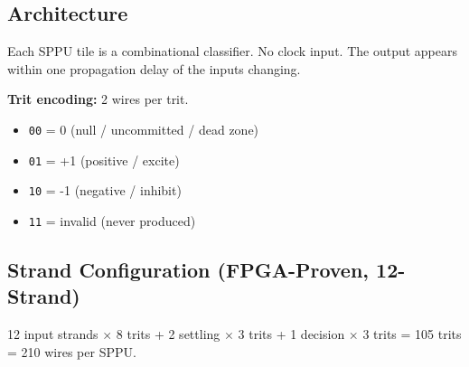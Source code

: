 \documentclass[11pt, a4paper]{article}
\begin{document}
\subsection{Architecture}

Each SPPU tile is a combinational classifier. No clock input.
The output appears within one propagation delay of the inputs
changing.

\textbf{Trit encoding:} 2 wires per trit.
\begin{itemize}[nosep]
  \item \texttt{00} = 0 (null / uncommitted / dead zone)
  \item \texttt{01} = +1 (positive / excite)
  \item \texttt{10} = -1 (negative / inhibit)
  \item \texttt{11} = invalid (never produced)
\end{itemize}

\subsection{Strand Configuration (FPGA-Proven, 12-Strand)}

12 input strands $\times$ 8 trits + 2 settling $\times$ 3 trits
+ 1 decision $\times$ 3 trits = 105 trits = 210 wires per SPPU.
\end{document}
